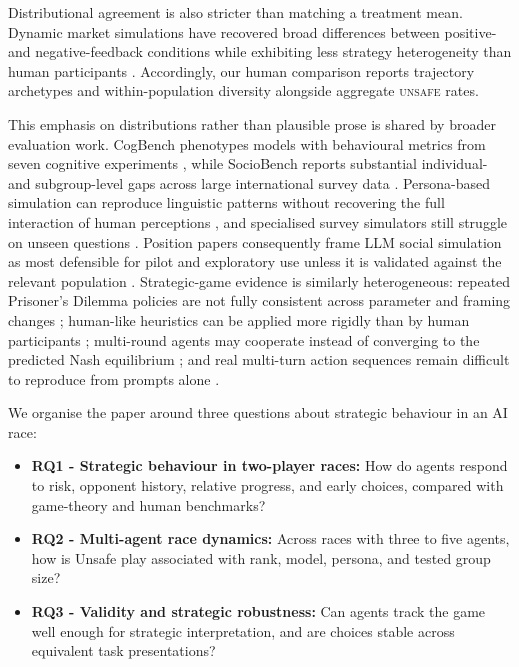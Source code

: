 \documentclass[sigconf]{aamas}
\newcommand{\Unsafe}{\textsc{unsafe}}
\begin{document}
Distributional agreement is also stricter than matching a treatment mean.
Dynamic market simulations have recovered broad differences between positive-
and negative-feedback conditions while exhibiting less strategy
heterogeneity than human participants \citep{delRioChanonaMarkets2025}.
Accordingly, our human comparison reports trajectory archetypes and
within-population diversity alongside aggregate \Unsafe{} rates.

This emphasis on distributions rather than plausible prose is shared by
broader evaluation work. CogBench phenotypes models with behavioural metrics
from seven cognitive experiments \citep{codaFornoCogBench2024}, while
SocioBench reports substantial individual- and subgroup-level gaps across
large international survey data \citep{wangSocioBench2025}. Persona-based
simulation can reproduce linguistic patterns without recovering the full
interaction of human perceptions \citep{wangHumanSubjectivity2024}, and
specialised survey simulators still struggle on unseen questions
\citep{suhSurveyDistributions2025}. Position papers consequently frame LLM
social simulation as most defensible for pilot and exploratory use unless it
is validated against the relevant population \citep{anthisSocialSimulation2025}.
Strategic-game evidence is similarly heterogeneous: repeated Prisoner's
Dilemma policies are not fully consistent across parameter and framing
changes \citep{palCooperation2026}; human-like heuristics can be applied more
rigidly than by human participants \citep{zhengBoundedRationality2025};
multi-round agents may cooperate instead of converging to the predicted Nash
equilibrium \citep{yaoCompetition2026}; and real multi-turn action sequences
remain difficult to reproduce from prompts alone \citep{luMultiTurn2026}.

We organise the paper around three questions about strategic behaviour in an
AI race:
\begin{itemize}
    \item \textbf{RQ1 - Strategic behaviour in two-player races:}
    How do agents respond to risk, opponent history, relative progress, and
    early choices, compared with game-theory and human benchmarks?

    \item \textbf{RQ2 - Multi-agent race dynamics:}
    Across races with three to five agents, how is Unsafe play associated with
    rank, model, persona, and tested group size?

    \item \textbf{RQ3 - Validity and strategic robustness:}
    Can agents track the game well enough for strategic interpretation, and
    are choices stable across equivalent task presentations?
\end{itemize}
\end{document}
